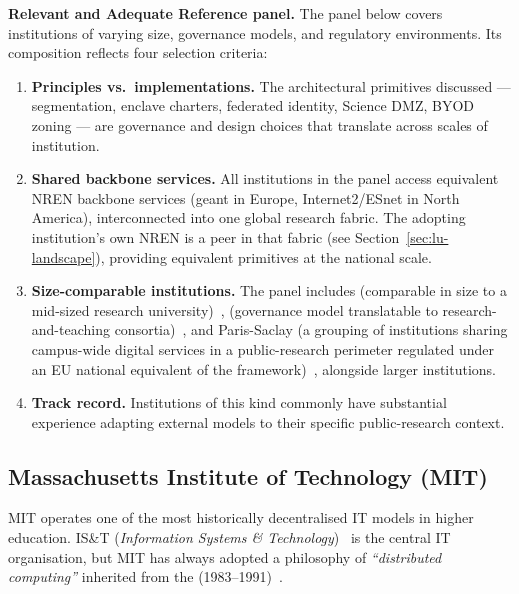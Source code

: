 \medskip
\noindent\textbf{Relevant and Adequate Reference panel.} The panel
below covers institutions of varying size, governance models, and
regulatory environments. Its composition reflects four selection
criteria:
\begin{enumerate}[nosep]
    \item \textbf{Principles vs.\ implementations.} The architectural
    primitives discussed --- segmentation, enclave charters,
    federated identity, Science DMZ, BYOD zoning --- are governance
    and design choices that translate across scales of institution.
    \item \textbf{Shared backbone services.} All institutions in
    the panel access equivalent NREN backbone services (\gls{geant}
    in Europe, Internet2/ESnet in North America), interconnected
    into one global research fabric. The adopting institution's own
    NREN is a peer in that fabric (see Section~\ref{sec:lu-landscape}),
    providing equivalent primitives at the national scale.
    \item \textbf{Size-comparable institutions.} The panel includes
     (comparable in size to a
    mid-sized research university)~\cite{epfl-rcp}, 
    (governance model translatable to research-and-teaching
    consortia)~\cite{cern-network}, and Paris-Saclay
    (a grouping of institutions sharing campus-wide digital
    services in a public-research perimeter regulated under an EU
    national equivalent of the framework)~\cite{paris-saclay-network},
    alongside larger institutions.
    \item \textbf{Track record.} Institutions of this kind commonly
    have substantial experience adapting external models to
    their specific public-research context.
\end{enumerate}

\subsection{Massachusetts Institute of Technology (MIT)}

MIT operates one of the most historically decentralised IT models in
higher education. IS\&T (\emph{Information Systems \&
Technology})~\cite{mit-ist} is the central IT organisation, but MIT has
always adopted a philosophy of \emph{``distributed computing''} inherited
from the 
(1983--1991)~\cite{mit-athena}.

